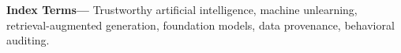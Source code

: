 \documentclass[10pt,twocolumn]{article}
\newenvironment{IEEEkeywords}{\par\smallskip\noindent\textbf{Index Terms---}}{\par}
\begin{document}
\begin{IEEEkeywords}
Trustworthy artificial intelligence, machine unlearning, retrieval-augmented generation, foundation models, data provenance, behavioral auditing.
\end{IEEEkeywords}













\end{document}
